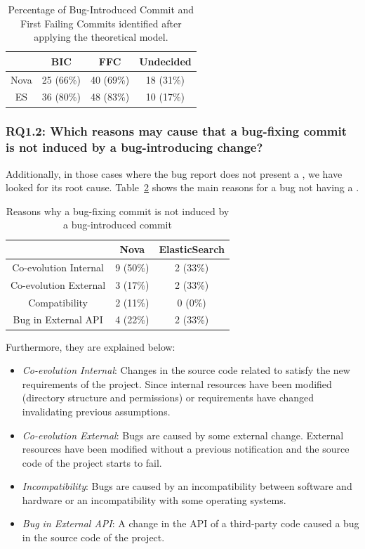 \documentclass[a4paper, 12pt]{book}
\begin{document}
\begin{table}[!t]
	\renewcommand{\arraystretch}{1.3}
	\caption{Percentage of Bug-Introduced Commit and First Failing Commits identified after applying the theoretical model.}
	\label{tableBICFFC}
	\centering
	\begin{tabular}{|c|c|c|c|}
		\hline
  		&  BIC & FFC & Undecided \\
		\hline
		\hline
		Nova & 25 (66\%) & 40 (69\%) & 18 (31\%)\\
		\hline
		ES & 36 (80\%) &  48 (83\%) & 10 (17\%)\\
		\hline
	\end{tabular}
\end{table}

\subsubsection{RQ1.2: Which reasons may cause that a bug-fixing commit is not induced by a bug-introducing change?}
Additionally, in those cases where the bug report does not present a \BIC, we have looked for its root cause. Table~\ref{tablereasosNoBIC} shows the main reasons for a bug not having a \BIC. 
\begin{table}[!t]
	\renewcommand{\arraystretch}{1.3}
	\caption{ Reasons why a bug-fixing commit is not induced by a bug-introduced commit }
	\label{tablereasosNoBIC}
	\centering
	\begin{tabular}{|c|c|c|}
		\hline
  		& Nova & ElasticSearch  \\
		\hline
		\hline
		Co-evolution Internal & 9 (50\%) & 2 (33\%) \\
		\hline
		Co-evolution External  & 3 (17\%) & 2 (33\%)\\
		\hline
		Compatibility & 2 (11\%) & 0 (0\%)\\
		\hline
		Bug in External API & 4 (22\%) & 2 (33\%)\\
		\hline
	\end{tabular}
\end{table}
Furthermore, they are explained below:
\begin{itemize}
 	\item \textit{Co-evolution Internal}: Changes in the source code related to satisfy the new requirements of the project. Since internal resources have been modified (directory structure and permissions) or requirements have changed invalidating previous assumptions.  	
	\item \textit{Co-evolution External}: Bugs are caused by some external change. External resources have been modified without a previous notification and the source code of the project starts to fail.
  	\item \textit{Incompatibility}: Bugs are caused by an incompatibility between software and hardware or an incompatibility with some operating systems.
  	\item \textit{Bug in External API}: A change in the API of a third-party code caused a bug in the source code of the project.
\end{itemize}
\end{document}
